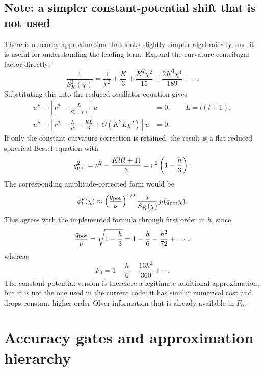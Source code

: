 \documentclass[11pt,a4paper]{article}
\newcommand{\SK}{S_K}
\newcommand{\order}{\mathcal{O}}
\begin{document}
\subsection*{Note: a simpler constant-potential shift that is not used}

There is a nearby approximation that looks slightly simpler algebraically, and
it is useful for understanding the leading term.  Expand the curvature
centrifugal factor directly:
\begin{equation}
  \frac{1}{\SK^2(\chi)}
  =\frac{1}{\chi^2}+\frac{K}{3}+\frac{K^2\chi^2}{15}
  +\frac{2K^3\chi^4}{189}+\cdots.
  \label{eq:SK-inverse-expansion}
\end{equation}
Substituting this into the reduced oscillator equation gives
\begin{align}
  u''+\left[\nu^2-\frac{L}{\SK^2(\chi)}\right]u&=0,
  \qquad L=l(l+1),\\
  u''+\left[\nu^2-\frac{L}{\chi^2}-\frac{KL}{3}
  +\order(K^2L\chi^2)\right]u&=0.
\end{align}
If only the constant curvature correction is retained, the result is a flat
reduced spherical-Bessel equation with
\begin{equation}
  q_{\rm pot}^2=\nu^2-\frac{K l(l+1)}{3}
  =\nu^2\left(1-\frac{h}{3}\right).
  \label{eq:qeff-constant-potential}
\end{equation}
The corresponding amplitude-corrected form would be
\begin{equation}
  \phi_l^\nu(\chi)\approx
  \left(\frac{q_{\rm pot}}{\nu}\right)^{1/2}
  \frac{\chi}{\SK(\chi)}j_l(q_{\rm pot}\chi).
  \label{eq:constant-potential-shift}
\end{equation}
This agrees with the implemented formula through first order in \(h\), since
\begin{equation}
  \frac{q_{\rm pot}}{\nu}
  =\sqrt{1-\frac{h}{3}}
  =1-\frac{h}{6}-\frac{h^2}{72}+\cdots,
\end{equation}
whereas
\begin{equation}
  F_0=1-\frac{h}{6}-\frac{13h^2}{360}+\cdots.
\end{equation}
The constant-potential version is therefore a legitimate additional
approximation, but it is not the one used in the current code: it has similar
numerical cost and drops constant higher-order Olver information that is already
available in \(F_0\).

\section{Accuracy gates and approximation hierarchy}
\end{document}
